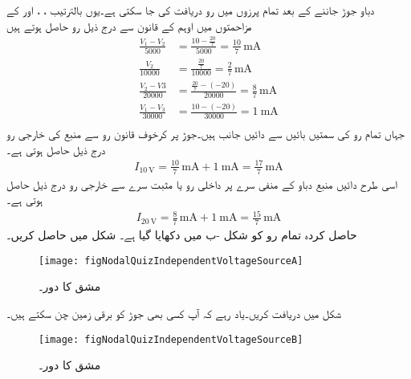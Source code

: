 دباو جوڑ جاننے کے بعد تمام پرزوں میں رو دریافت کی جا سکتی ہے۔یوں بالترتیب  ، ،  اور  کے مزاحمتوں میں اوہم کے قانون سے درج ذیل رو حاصل ہوتے ہیں
\begin{align*}
\frac{V_1-V_2}{5000}&=\frac{10-\frac{20}{7}}{5000}=\frac{10}{7} \,\si{\milli\ampere}\\
\frac{V_2}{10000}&=\frac{\frac{20}{7}}{10000}=\frac{2}{7} \,\si{\milli\ampere}\\
\frac{V_2-V3}{20000}&=\frac{\frac{20}{7}-(-20)}{20000}=\frac{8}{7} \,\si{\milli\ampere}\\
\frac{V_1-V_3}{30000}&=\frac{10-(-20)}{30000}=\SI{1}{\milli\ampere}\\
\end{align*}
جہاں تمام رو کی سمتیں بائیں سے دائیں جانب ہیں۔جوڑ  پر کرخوف قانون رو سے  منبع کی خارجی رو درج ذیل حاصل ہوتی ہے۔
\begin{align*}
I_{\SI{10}{\volt}}=\frac{10}{7} \,\si{\milli\ampere}+\SI{1}{\milli\ampere}=\frac{17}{7} \,\si{\milli\ampere}
\end{align*}
اسی طرح دائیں منبع دباو کے منفی سرے پر داخلی رو یا مثبت سرے سے خارجی رو درج ذیل حاصل ہوتی ہے۔
\begin{align*}
I_{\SI{20}{\volt}}=\frac{8}{7} \,\si{\milli\ampere}+\SI{1}{\milli\ampere}=\frac{15}{7} \,\si{\milli\ampere}
\end{align*}
حاصل کردہ تمام رو کو شکل -ب میں دکھایا گیا ہے۔
شکل  میں  حاصل کریں۔
\begin{figure}
\centering
\texttt{[image: figNodalQuizIndependentVoltageSourceA]}
\caption{مشق  کا دور۔}
\label{شکل_جوڑ_مشق_غیر_تابع_منبع_دباو_الف}
\end{figure}


شکل  میں  دریافت کریں۔یاد رہے کہ آپ کسی بھی جوڑ کو برقی زمین چن سکتے ہیں۔
\begin{figure}
\centering
\texttt{[image: figNodalQuizIndependentVoltageSourceB]}
\caption{مشق  کا دور۔}
\label{شکل_جوڑ_مشق_غیر_تابع_منبع_دباو_ب}
\end{figure}

